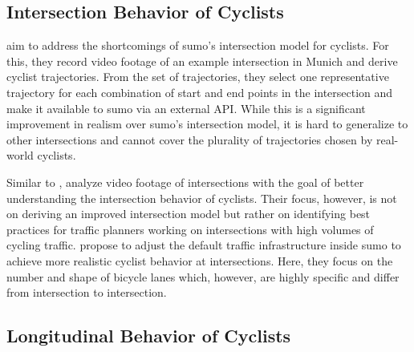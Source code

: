 \subsection{Intersection Behavior of Cyclists}%
\label{subsec:rw_intersection}

\textcite{kaths2016integration} aim to address the shortcomings of \ac{sumo}'s intersection model for cyclists.
For this, they record video footage of an example intersection in Munich and derive cyclist trajectories.
From the set of trajectories, they select one representative trajectory for each combination of start and end points in the intersection and make it available to \ac{sumo} via an external API.
While this is a significant improvement in realism over \ac{sumo}'s intersection model, it is hard to generalize to other intersections and cannot cover the plurality of trajectories chosen by real-world cyclists.


Similar to \textcite{kaths2016integration}, \textcite{grigoropoulos2022traffic} analyze video footage of intersections with the goal of better understanding the intersection behavior of cyclists.
Their focus, however, is not on deriving an improved intersection model but rather on identifying best practices for traffic planners working on intersections with high volumes of cycling traffic.
\textcite{grigoropoulos2019modelling} propose to adjust the default traffic infrastructure inside \ac{sumo} to achieve more realistic cyclist behavior at intersections.
Here, they focus on the number and shape of bicycle lanes which, however, are highly specific and differ from intersection to intersection.

\subsection{Longitudinal Behavior of Cyclists}%
\label{subsec:rw_longitudinal}

